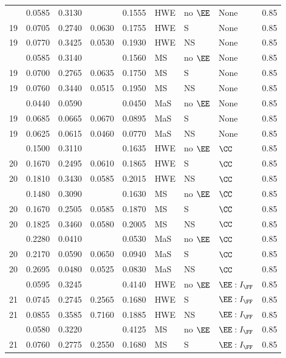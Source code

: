 \begin{longtable}[t]{lllllllll}
\endfoot
\bottomrule
\endlastfoot
19 & 0.0585 & 0.3130 &  & 0.1555 & HWE & no $\EE$ & None & 0.85\\
19 & 0.0705 & 0.2740 & 0.0630 & 0.1755 & HWE & S & None & 0.85\\
19 & 0.0770 & 0.3425 & 0.0530 & 0.1930 & HWE & NS & None & 0.85\\
\addlinespace
19 & 0.0585 & 0.3140 &  & 0.1560 & MS & no $\EE$ & None & 0.85\\
19 & 0.0700 & 0.2765 & 0.0635 & 0.1750 & MS & S & None & 0.85\\
19 & 0.0760 & 0.3440 & 0.0515 & 0.1950 & MS & NS & None & 0.85\\
\addlinespace
19 & 0.0440 & 0.0590 &  & 0.0450 & MaS & no $\EE$ & None & 0.85\\
19 & 0.0685 & 0.0665 & 0.0670 & 0.0895 & MaS & S & None & 0.85\\
19 & 0.0625 & 0.0615 & 0.0460 & 0.0770 & MaS & NS & None & 0.85\\
\addlinespace
20 & 0.1500 & 0.3110 &  & 0.1635 & HWE & no $\EE$ & $\CC$ & 0.85\\
20 & 0.1670 & 0.2495 & 0.0610 & 0.1865 & HWE & S & $\CC$ & 0.85\\
20 & 0.1810 & 0.3430 & 0.0585 & 0.2015 & HWE & NS & $\CC$ & 0.85\\
\addlinespace
20 & 0.1480 & 0.3090 &  & 0.1630 & MS & no $\EE$ & $\CC$ & 0.85\\
20 & 0.1670 & 0.2505 & 0.0585 & 0.1870 & MS & S & $\CC$ & 0.85\\
20 & 0.1825 & 0.3460 & 0.0580 & 0.2005 & MS & NS & $\CC$ & 0.85\\
\addlinespace
20 & 0.2280 & 0.0410 &  & 0.0530 & MaS & no $\EE$ & $\CC$ & 0.85\\
20 & 0.2170 & 0.0590 & 0.0650 & 0.0940 & MaS & S & $\CC$ & 0.85\\
20 & 0.2695 & 0.0480 & 0.0525 & 0.0830 & MaS & NS & $\CC$ & 0.85\\
\addlinespace
21 & 0.0595 & 0.3245 &  & 0.4140 & HWE & no $\EE$ & $\EE:I_{\FF}$ & 0.85\\
21 & 0.0745 & 0.2745 & 0.2565 & 0.1680 & HWE & S & $\EE:I_{\FF}$ & 0.85\\
21 & 0.0855 & 0.3585 & 0.7160 & 0.1885 & HWE & NS & $\EE:I_{\FF}$ & 0.85\\
\addlinespace
21 & 0.0580 & 0.3220 &  & 0.4125 & MS & no $\EE$ & $\EE:I_{\FF}$ & 0.85\\
21 & 0.0760 & 0.2775 & 0.2550 & 0.1680 & MS & S & $\EE:I_{\FF}$ & 0.85\\

\end{longtable}
